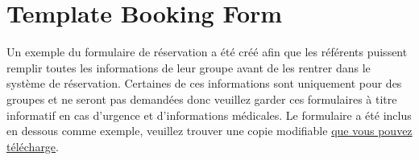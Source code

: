 \documentclass[a4paper, 11pt]{report}
\begin{document}
\chapter{Template Booking Form}
\label{chap:template-booking-form}

Un exemple du formulaire de r\'eservation a \'et\'e cr\'e\'e afin que les r\'ef\'erents puissent remplir toutes les informations de leur groupe avant de les rentrer dans le syst\`eme de r\'eservation. Certaines de ces informations sont uniquement pour des groupes et ne seront pas demand\'ees donc veuillez garder ces formulaires \`a titre informatif en cas d'urgence et d'informations m\'edicales. Le formulaire a \'et\'e inclus en dessous comme exemple, veuillez trouver une copie modifiable \href{https://drive.google.com/file/d/1oSFIkZQxzes3VTi5ZqPHCcAu4DiscvOm/view}{que vous pouvez t\'el\'echarge}. 



\makedocumentbackpage
\end{document}
